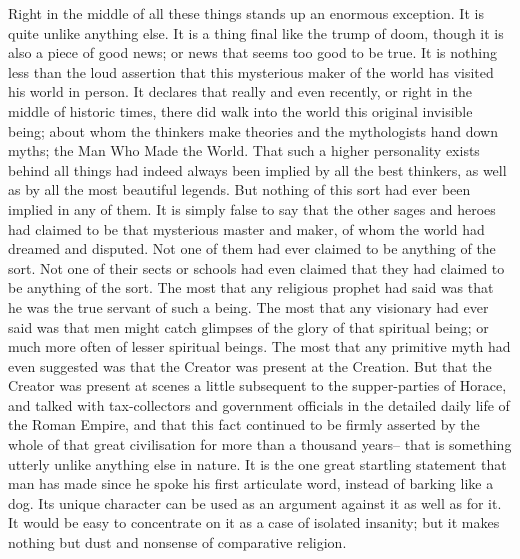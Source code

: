Right in the middle of all these things stands up an enormous exception. It is quite unlike anything else. It is a thing final like the trump of doom, though it is also a piece of good news; or news that seems too good to be true. It is nothing less than the loud assertion that this mysterious maker of the world has visited his world in person. It declares that really and even recently, or right in the middle of historic times, there did walk into the world this original invisible being; about whom the thinkers make theories and the mythologists hand down myths; the Man Who Made the World. That such a higher personality exists behind all things had indeed always been implied by all the best thinkers, as well as by all the most beautiful legends. But nothing of this sort had ever been implied in any of them. It is simply false to say that the other sages and heroes had claimed to be that mysterious master and maker, of whom the world had dreamed and disputed. Not one of them had ever claimed to be anything of the sort. Not one of their sects or schools had even claimed that they had claimed to be anything of the sort. The most that any religious prophet had said was that he was the true servant of such a being. The most that any visionary had ever said was that men might catch glimpses of the glory of that spiritual being; or much more often of lesser spiritual beings. The most that any primitive myth had even suggested was that the Creator was present at the Creation. But that the Creator was present at scenes a little subsequent to the supper-parties of Horace, and talked with tax-collectors and government officials in the detailed daily life of the Roman Empire, and that this fact continued to be firmly asserted by the whole of that great civilisation for more than a thousand years-- that is something utterly unlike anything else in nature. It is the one great startling statement that man has made since he spoke his first articulate word, instead of barking like a dog. Its unique character can be used as an argument against it as well as for it. It would be easy to concentrate on it as a case of isolated insanity; but it makes nothing but dust and nonsense of comparative religion.


